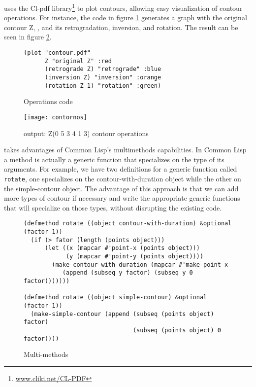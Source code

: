\goiaba{} uses the Cl-pdf library\footnote{\url{www.cliki.net/CL-PDF}}
to plot contours, allowing easy visualization of contour operations.
For instance, the code in figure \ref{fig:operations-code} generates a
graph with the original contour Z, , and its
retrogradation, inversion, and rotation. The result can be seen in
figure \ref{fig:operacoes}.

\begin{figure}
  \centering
\begin{verbatim}
(plot "contour.pdf"
      Z "original Z" :red
      (retrograde Z) "retrograde" :blue
      (inversion Z) "inversion" :orange
      (rotation Z 1) "rotation" :green)
\end{verbatim}
  \caption{Operations code}
  \label{fig:operations-code}
\end{figure}

\begin{figure}
  \centering
  \texttt{[image: contornos]}
  \caption{\goiaba{} output: Z(0 5 3 4 1 3) contour operations}
  \label{fig:operacoes}
\end{figure}

\goiaba{} takes advantages of Common Lisp's multimethods capabilities.
In Common Lisp a method is actually a generic function that
specializes on the type of its arguments. For example, we have two
definitions for a generic function called \texttt{rotate}, one
specializes on the contour-with-duration object while the other on the
simple-contour object. The advantage of this approach is that we can
add more types of contour if necessary and write the appropriate
generic functions that will specialize on those types, without
disrupting the existing code.

\begin{figure*}
\begin{verbatim}
(defmethod rotate ((object contour-with-duration) &optional (factor 1))
  (if (> fator (length (points object)))
      (let ((x (mapcar #'point-x (points object)))
            (y (mapcar #'point-y (points object))))
        (make-contour-with-duration (mapcar #'make-point x
           (append (subseq y factor) (subseq y 0 factor)))))))

(defmethod rotate ((object simple-contour) &optional (factor 1))
  (make-simple-contour (append (subseq (points object) factor)
                               (subseq (points object) 0 factor))))
\end{verbatim}
  \caption{Multi-methods}
  \label{fig:code-methods}
\end{figure*}

